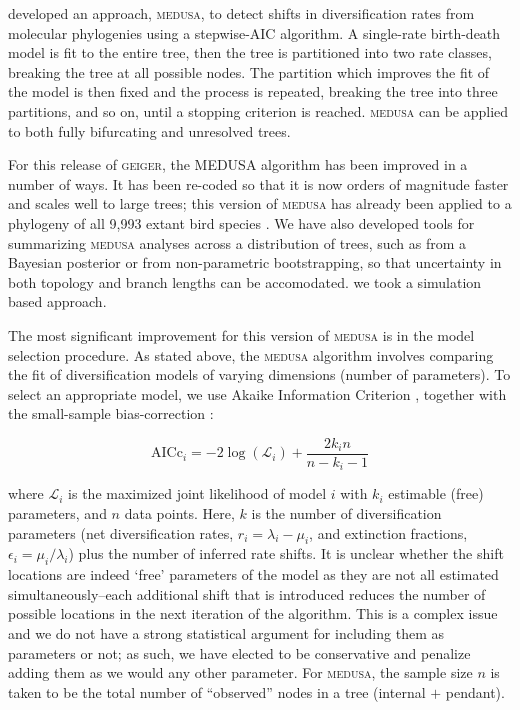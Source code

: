 \citet{Alfaro2009} developed an approach, \textsc{medusa}, to detect shifts in diversification rates from molecular phylogenies using a stepwise-AIC algorithm. A single-rate birth-death model is fit to the entire tree, then the tree is partitioned into two rate classes, breaking the tree at all possible nodes. The partition which improves the fit of the model is then fixed and the process is repeated, breaking the tree into three partitions, and so on, until a stopping criterion is reached. \textsc{medusa} can be applied to both fully bifurcating and unresolved trees. 

For this release of \textsc{geiger}, the MEDUSA algorithm has been improved in a number of ways. It has been re-coded so that it is now orders of magnitude faster and scales well to large trees; this version of \textsc{medusa} has already been applied to a phylogeny of all 9,993 extant bird species \citep{Jetz2012}. We have also developed tools for summarizing \textsc{medusa} analyses across a distribution of trees, such as from a Bayesian posterior or from non-parametric bootstrapping, so that uncertainty in both topology and branch lengths can be accomodated. we took a simulation based approach. 

The most significant improvement for this version of \textsc{medusa} is in the model selection procedure. As stated above, the \textsc{medusa} algorithm involves comparing the fit of diversification models of varying dimensions (number of parameters). To select an appropriate model, we use Akaike Information Criterion \citep[AIC;][]{Akaike1974}, together with the small-sample bias-correction \citep[AICc;][]{BA2004}:

\begin{equation}
\mathrm{AICc}_{i} = -2 \log (\mathcal{L}_{i}) +
	\frac{2k_{i}n}{n-k_{i}-1}
\end{equation}

where $\mathcal{L}_{i}$ is the maximized joint likelihood of model $i$ with $k_{i}$ estimable (free) parameters, and $n$ data points. Here, $k$ is the number of diversification parameters (net diversification rates, $r_{i} = \lambda_{i} - \mu_{i}$, and extinction fractions, $\epsilon_{i} = \mu_{i}/\lambda_{i}$) plus the number of inferred rate shifts. It is unclear whether the shift locations are indeed `free' parameters of the model as they are not all estimated simultaneously--each additional shift that is introduced reduces the number of possible locations in the next iteration of the algorithm. This is a complex issue and we do not have a strong statistical argument for including them as parameters or not; as such, we have elected to be conservative and penalize adding them as we would any other parameter. For \textsc{medusa}, the sample size $n$ is taken to be the total number of ``observed'' nodes in a tree (internal $+$ pendant). 

